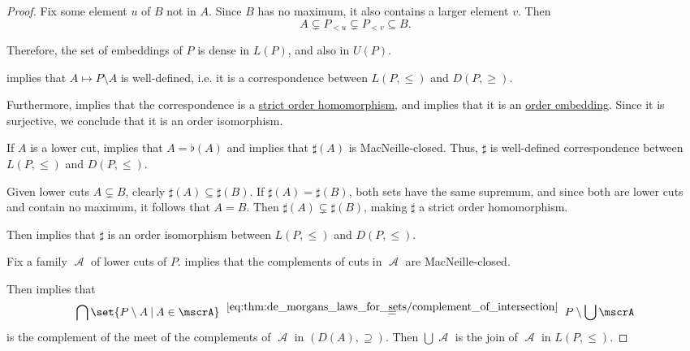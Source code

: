 \begin{proof}
  Fix some element \( u \) of \( B \) not in \( A \). Since \( B \) has no maximum, it also contains a larger element \( v \). Then
  \begin{equation*}
    A \subsetneq P_{< u} \subsetneq P_{< v} \subseteq B.
  \end{equation*}

  Therefore, the set of embeddings of \( P \) is dense in \( L(P) \), and also in \( U(P) \).

    implies that \( A \mapsto P \setminus A \) is well-defined, i.e. it is a correspondence between \( L(P, \leq) \) and \( D(P, \geq) \).

  Furthermore,  implies that the correspondence is a \hyperref[def:order_function/preserving]{strict order homomorphism}, and  implies that it is an \hyperref[def:preordered_set/homomorphism]{order embedding}. Since it is surjective, we conclude that it is an order isomorphism.

   If \( A \) is a lower cut,  implies that \( A = \flat(A) \) and  implies that \( \sharp(A) \) is MacNeille-closed. Thus, \( \sharp \) is well-defined correspondence between \( L(P, \leq) \) and \( D(P, \leq) \).

  Given lower cuts \( A \subsetneq B \), clearly \( \sharp(A) \subseteq \sharp(B) \). If \( \sharp(A) = \sharp(B) \), both sets have the same supremum, and since both are lower cuts and contain no maximum, it follows that \( A = B \). Then \( \sharp(A) \subsetneq \sharp(B) \), making \( \sharp \) a strict order homomorphism.

  Then  implies that \( \sharp \) is an order isomorphism between \( L(P, \leq) \) and \( D(P, \leq) \).

   Fix a family \( \mscrA \) of lower cuts of \( P \).  implies that the complements of cuts in \( \mscrA \) are MacNeille-closed.

  Then  implies that
  \begin{equation*}
    \bigcap \set{ P \setminus A \given A \in \mscrA }
    \reloset {\eqref{eq:thm:de_morgans_laws_for_sets/complement_of_intersection}} =
    P \setminus \bigcup \mscrA
  \end{equation*}
  is the complement of the meet of the complements of \( \mscrA \) in \( (D(A), \supseteq) \). Then \( \bigcup \mscrA \) is the join of \( \mscrA \) in \( L(P, \leq) \).


\end{proof}
